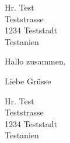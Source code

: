 \documentclass{amivletter}
\begin{document}
\subject{\LaTeX\ Brief ist da, Feedback erwünscht!}
\signature{Alexander}


\begin{letter}{%
    Hr. Test\\
    Teststrasse\\
    1234 Teststadt\\
    Testanien%
}

\opening{Hallo zusammen,}

\Blindtext

\closing{Liebe Grüsse}


\end{letter}



\genericamivinfoblock  %

\subject{}

\begin{letter}{%
    Hr. Test\\
    Teststrasse\\
    1234 Teststadt\\
    Testanien%
}

\opening{}

\blindtext

\end{letter}
\end{document}
